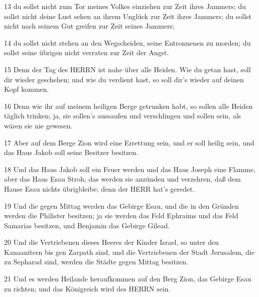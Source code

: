 \par 13 du sollst nicht zum Tor meines Volkes einziehen zur Zeit ihres Jammers; du sollst nicht deine Lust sehen an ihrem Unglück zur Zeit ihres Jammers; du sollst nicht nach seinem Gut greifen zur Zeit seines Jammers;
\par 14 du sollst nicht stehen an den Wegscheiden, seine Entronnenen zu morden; du sollst seine übrigen nicht verraten zur Zeit der Angst.
\par 15 Denn der Tag des HERRN ist nahe über alle Heiden. Wie du getan hast, soll dir wieder geschehen; und wie du verdient hast, so soll dir's wieder auf deinen Kopf kommen.
\par 16 Denn wie ihr auf meinem heiligen Berge getrunken habt, so sollen alle Heiden täglich trinken; ja, sie sollen's aussaufen und verschlingen und sollen sein, als wären sie nie gewesen.
\par 17 Aber auf dem Berge Zion wird eine Errettung sein, und er soll heilig sein, und das Haus Jakob soll seine Besitzer besitzen.
\par 18 Und das Haus Jakob soll ein Feuer werden und das Haus Joseph eine Flamme, aber das Haus Esau Stroh; das werden sie anzünden und verzehren, daß dem Hause Esau nichts übrigbleibe; denn der HERR hat's geredet.
\par 19 Und die gegen Mittag werden das Gebirge Esau, und die in den Gründen werden die Philister besitzen; ja sie werden das Feld Ephraims und das Feld Samarias besitzen, und Benjamin das Gebirge Gilead.
\par 20 Und die Vertriebenen dieses Heeres der Kinder Israel, so unter den Kanaanitern bis gen Zarpath sind, und die Vertriebenen der Stadt Jerusalem, die zu Sepharad sind, werden die Städte gegen Mittag besitzen.
\par 21 Und es werden Heilande heraufkommen auf den Berg Zion, das Gebirge Esau zu richten; und das Königreich wird des HERRN sein.

